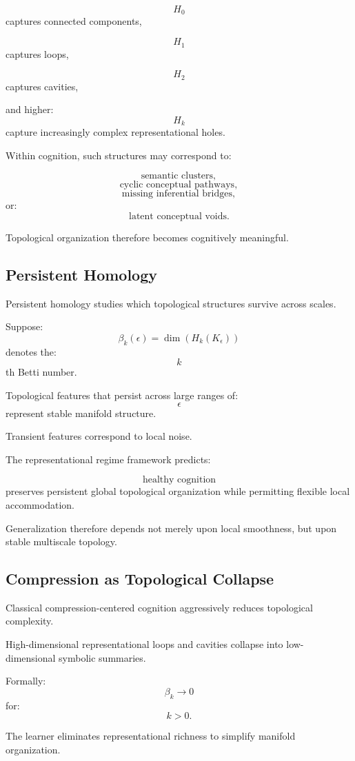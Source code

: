 \documentclass[12pt,a4paper]{article}
\begin{document}
\[
H_0
\]
captures connected components,

\[
H_1
\]
captures loops,

\[
H_2
\]
captures cavities,

and higher:
\[
H_k
\]
capture increasingly complex representational holes.

Within cognition, such structures may correspond to:

\[
\text{semantic clusters},
\]
\[
\text{cyclic conceptual pathways},
\]
\[
\text{missing inferential bridges},
\]
or:
\[
\text{latent conceptual voids}.
\]

Topological organization therefore becomes cognitively meaningful.

\subsection{Persistent Homology}

Persistent homology studies which topological structures survive across scales.

Suppose:
\[
\beta_k(\epsilon)
=
\dim(H_k(K_\epsilon))
\]
denotes the:
\[
k
\]
th Betti number.

Topological features that persist across large ranges of:
\[
\epsilon
\]
represent stable manifold structure.

Transient features correspond to local noise.

The representational regime framework predicts:

\[
\text{healthy cognition}
\]
preserves persistent global topological organization while permitting flexible local accommodation.

Generalization therefore depends not merely upon local smoothness, but upon stable multiscale topology.

\subsection{Compression as Topological Collapse}

Classical compression-centered cognition aggressively reduces topological complexity.

High-dimensional representational loops and cavities collapse into low-dimensional symbolic summaries.

Formally:
\[
\beta_k
\rightarrow
0
\]
for:
\[
k>0.
\]

The learner eliminates representational richness to simplify manifold organization.
\end{document}
